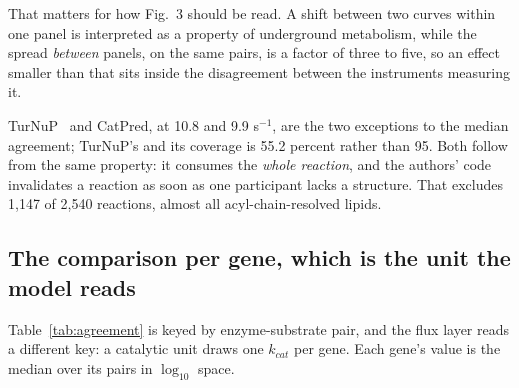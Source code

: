 That matters for how Fig.~3 should be read. A shift between two curves within one panel is
interpreted as a property of underground metabolism, while the spread \emph{between} panels,
on the same pairs, is a factor of three to five, so an effect smaller than that sits inside
the disagreement between the instruments measuring it.

TurNuP~\cite{krollTurnoverNumberPredictions2023} and CatPred, at 10.8 and 9.9 s$^{-1}$,
are the two exceptions to the median agreement; TurNuP's and its coverage is
55.2 percent rather than 95. Both follow from the same property: it consumes the
\emph{whole reaction}, and the authors' code invalidates a reaction as soon as one
participant lacks a structure. That excludes 1{,}147 of 2{,}540 reactions, almost all
acyl-chain-resolved lipids.

\subsection{The comparison per gene, which is the unit the model reads}

Table~\ref{tab:agreement} is keyed by enzyme-substrate pair, and the flux layer reads a
different key: a catalytic unit draws one $k_{cat}$ per gene. Each gene's value is the median
over its pairs in $\log_{10}$ space.

